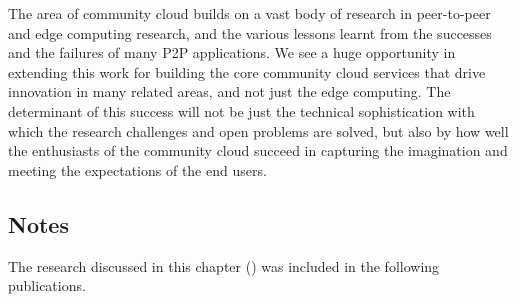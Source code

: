 



\vspace{10 mm}


The area of community cloud builds on a vast body of research in peer-to-peer and edge computing research, and the various lessons learnt from the successes and the failures of many P2P applications.
We see a huge opportunity in extending this work for building the core community cloud services that drive innovation in many related areas, and not just the edge computing.
The determinant of this success will not be just the technical sophistication with which the research challenges and open problems are solved,
but also by how well the enthusiasts of the community cloud succeed in capturing the imagination and meeting the expectations of the end users.


\subsection*{Notes}
The research discussed in this chapter () was included in the following publications.

\begin{refsection} %
	\nocite{Khan2015Current}
	\nocite{Khan2015CommunityClouds}

	\nocite{Khan2014Macroeconomic, Khan2014Sparks}

	\nocite{Khan2013Clouds}

	\nocite{Khan2015DSS}

	\nocite{Jimenez2013, Freitag2014Energy, Baig2015Community, Selimi2015Cloud, Khan2015Enabling}

	\printbibliography[heading=none]

\end{refsection}
